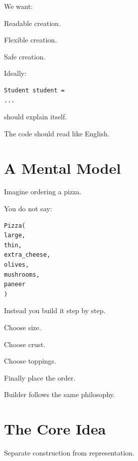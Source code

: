 \documentclass[11pt,a4paper]{book}
\begin{document}
\begin{idea}

We want:

Readable creation.

Flexible creation.

Safe creation.

\end{idea}

Ideally:

\begin{verbatim}
Student student =
...
\end{verbatim}

should explain itself.

The code should read like English.


\section{A Mental Model}

\begin{mentalmodel}

Imagine ordering a pizza.

You do not say:

\begin{verbatim}
Pizza(
large,
thin,
extra_cheese,
olives,
mushrooms,
paneer
)
\end{verbatim}

Instead you build it step by step.

Choose size.

Choose crust.

Choose toppings.

Finally place the order.

Builder follows the same philosophy.

\end{mentalmodel}


\section{The Core Idea}

\begin{idea}

Separate construction from representation.

\end{idea}
\end{document}
